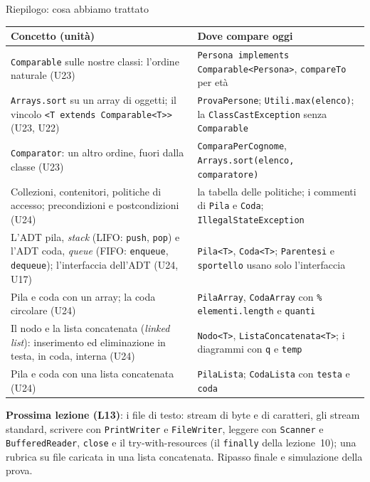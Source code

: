 \documentclass[10pt,aspectratio=169,xcolor={table}]{beamer}
\begin{document}
\begin{frame}{Riepilogo: cosa abbiamo trattato}
\footnotesize
\begin{center}
\renewcommand{\arraystretch}{1.1}
\scriptsize
\begin{tabular}{|>{\raggedright\arraybackslash}p{6.4cm}|>{\raggedright\arraybackslash}p{7.4cm}|}
\hline
\textbf{Concetto (unità)} & \textbf{Dove compare oggi} \\
\hline
\texttt{Comparable} sulle nostre classi: l'ordine naturale (U23) & \texttt{Persona implements Comparable<Persona>}, \texttt{compareTo} per età \\
\hline
\texttt{Arrays.sort} su un array di oggetti; il vincolo \texttt{<T extends Comparable<T>>} (U23, U22) & \texttt{ProvaPersone}; \texttt{Utili.max(elenco)}; la \texttt{ClassCastException} senza \texttt{Comparable} \\
\hline
\texttt{Comparator}: un altro ordine, fuori dalla classe (U23) & \texttt{ComparaPerCognome}, \texttt{Arrays.sort(elenco, comparatore)} \\
\hline
Collezioni, contenitori, politiche di accesso; precondizioni e postcondizioni (U24) & la tabella delle politiche; i commenti di \texttt{Pila} e \texttt{Coda}; \texttt{IllegalStateException} \\
\hline
L'ADT pila, \emph{stack} (LIFO: \texttt{push}, \texttt{pop}) e l'ADT coda, \emph{queue} (FIFO: \texttt{enqueue}, \texttt{dequeue}); l'interfaccia dell'ADT (U24, U17) & \texttt{Pila<T>}, \texttt{Coda<T>}; \texttt{Parentesi} e \texttt{sportello} usano solo l'interfaccia \\
\hline
Pila e coda con un array; la coda circolare (U24) & \texttt{PilaArray}, \texttt{CodaArray} con \texttt{\% elementi.length} e \texttt{quanti} \\
\hline
Il nodo e la lista concatenata (\emph{linked list}): inserimento ed eliminazione in testa, in coda, interna (U24) & \texttt{Nodo<T>}, \texttt{ListaConcatenata<T>}; i diagrammi con \texttt{q} e \texttt{temp} \\
\hline
Pila e coda con una lista concatenata (U24) & \texttt{PilaLista}; \texttt{CodaLista} con \texttt{testa} e \texttt{coda} \\
\hline
\end{tabular}
\end{center}

\vspace{0.1cm}
\textbf{Prossima lezione (L13)}: i file di testo: stream di byte e di caratteri, gli stream standard, scrivere con \texttt{PrintWriter} e \texttt{FileWriter}, leggere con \texttt{Scanner} e \texttt{BufferedReader}, \texttt{close} e il try-with-resources (il \texttt{finally} della lezione~10); una rubrica su file caricata in una lista concatenata. Ripasso finale e simulazione della prova.
\end{frame}
\end{document}
